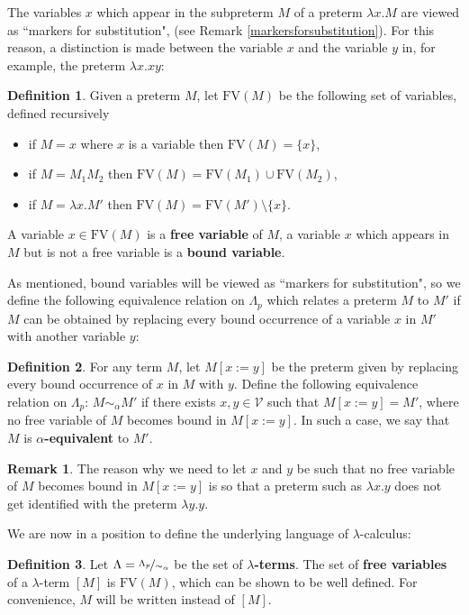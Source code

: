 \documentclass[12pt]{article}
\theoremstyle{plane}
\theoremstyle{definition}
\newtheorem{defn}{Definition}
\newtheorem{remark}{Remark}
\newcommand{\scr}[1]{\mathscr{#1}}
\begin{document}
	The variables $x$ which appear in the subpreterm $M$ of a preterm $\lambda x. M$ are viewed as ``markers for substitution", (see Remark \ref{markersforsubstitution}). For this reason, a distinction is made between the variable $x$ and the variable $y$ in, for example, the preterm $\lambda x. xy$:
	\begin{defn}
		Given a preterm $M$, let $\text{FV}(M)$ be the following set of variables, defined recursively
		\begin{itemize}
			\item if $M = x$ where $x$ is a variable then $\text{FV}(M) = \lbrace x \rbrace$,
			\item if $M = M_1M_2$ then $\text{FV}(M) = \text{FV}(M_1) \cup \text{FV}(M_2)$,
			\item if $M = \lambda x. M'$ then $\text{FV}(M) = \text{FV}(M') \setminus \lbrace x \rbrace$.
		\end{itemize}
		A variable $x \in \text{FV}(M)$ is a \textbf{free variable} of $M$, a variable $x$ which appears in $M$ but is not a free variable is a \textbf{bound variable}.
	\end{defn}
	As mentioned, bound variables will be viewed as ``markers for substitution", so we define the following equivalence relation on $\Lambda_p$ which relates a preterm $M$ to $M'$ if $M$ can be obtained by replacing every bound occurrence of a variable $x$ in $M'$ with another variable $y$:
	\begin{defn}
		For any term $M$, let $M[x := y]$ be the preterm given by replacing every bound occurrence of $x$ in $M$ with $y$. Define the following equivalence relation on $\Lambda_p$: $M \sim_\alpha M'$ if there exists $x,y \in \scr{V}$ such that $M[x := y] = M'$, where no free variable of $M$ becomes bound in $M[x := y]$. In such a case, we say that $M$ is \textbf{$\alpha$-equivalent} to $M'$.
	\end{defn}
	\begin{remark}
		The reason why we need to let $x$ and $y$ be such that no free variable of $M$ becomes bound in $M[x:=y]$ is so that a preterm such as $\lambda x. y$ does not get identified with the preterm $\lambda y. y$.
	\end{remark}
	We are now in a position to define the underlying language of $\lambda$-calculus:
	\begin{defn}
		Let $\Lambda = \nicefrac{\Lambda_p}{\sim_\alpha}$ be the set of \textbf{$\lambda$-terms}. The set of \textbf{free variables} of a $\lambda$-term $[M]$ is $\text{FV}(M)$, which can be shown to be well defined. For convenience, $M$ will be written instead of $[M]$.
	\end{defn}
\end{document}
